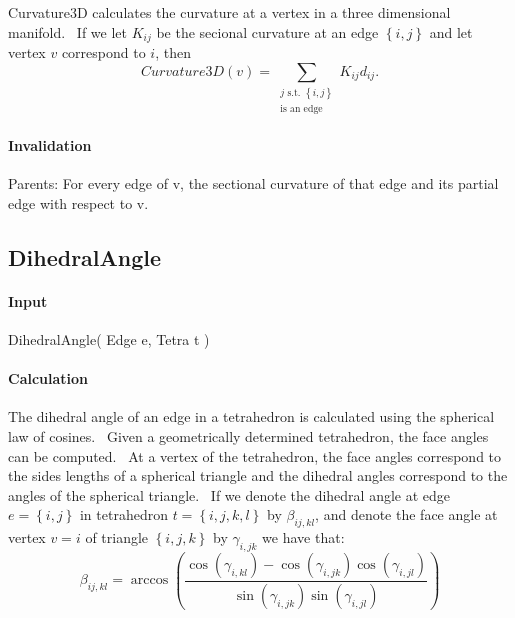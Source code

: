 Curvature3D calculates the curvature at a vertex in a three dimensional
manifold. \ If we let $K_{ij}$ be the secional curvature at an edge $\left\{
i,j\right\} $ and let vertex $v$ correspond to $i$, then%
\begin{equation*}
Curvature3D\left( v\right) =\sum\limits_{\substack{ j\text{ s.t. }\left\{
i,j\right\}  \\ \text{is an edge}}}K_{ij}d_{ij}.
\end{equation*}

\paragraph{Invalidation}

Parents: For every edge of v, the sectional curvature of that edge and its
partial edge with respect to v.\bigskip 

\subsection{DihedralAngle}

\paragraph{Input}

DihedralAngle( Edge e, Tetra t )

\paragraph{Calculation}

The dihedral angle of an edge in a tetrahedron is calculated using the
spherical law of cosines. \ Given a geometrically determined tetrahedron,
the face angles can be computed. \ At a vertex of the tetrahedron, the face
angles correspond to the sides lengths of a spherical triangle and the
dihedral angles correspond to the angles of the spherical triangle. \ If we
denote the dihedral angle at edge $e=\left\{ i,j\right\} $ in tetrahedron $%
t=\left\{ i,j,k,l\right\} $ by $\beta _{ij,kl}$, and denote the face angle
at vertex $v=i$ of triangle $\left\{ i,j,k\right\} $ by $\gamma _{i,jk}$ we
have that:%
\begin{equation*}
\beta _{ij,kl}=\arccos \left( \frac{\cos \left( \gamma _{i,kl}\right) -\cos
\left( \gamma _{i,jk}\right) \cos \left( \gamma _{i,jl}\right) }{\sin \left(
\gamma _{i,jk}\right) \sin \left( \gamma _{i,jl}\right) }\right)
\end{equation*}

